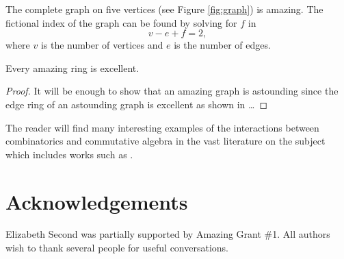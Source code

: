 \documentclass[12pt]{article}
\begin{document}
\begin{example}
  The complete graph on five vertices (see Figure \ref{fig:graph}) is
  amazing. The fictional index of the graph can be found by solving
  for $f$ in
  \begin{equation}
    v-e+f=2,
  \end{equation}
  where $v$ is the number of vertices and $e$ is the number of edges.
\end{example}

\begin{theorem}
  Every amazing ring is excellent.
\end{theorem}

\begin{proof}
  It will be enough to show that an amazing graph is astounding since
  the edge ring of an astounding graph is excellent as shown in \dots
\end{proof}

The reader will find many interesting examples of the interactions
between combinatorics and commutative algebra in the vast literature
on the subject which includes works such as
\cite{eisenbud1994binomialideals,zbMATH00922152,zbMATH03545783,zbMATH00833410,zbMATH06413064}.


\section*{Acknowledgements}

Elizabeth Second was partially supported by Amazing Grant
\#1.  All authors wish to thank several people for useful
conversations.


% 
% 

\end{document}
